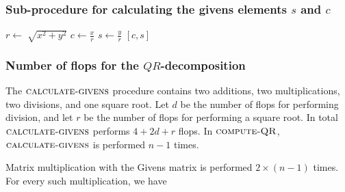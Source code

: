 \subsubsection*{Sub-procedure for calculating the givens elements $s$ and $c$}
\begin{algorithmic}
\State $r \gets \sqrt[]{x^2+y^2 }$ 
\State $c \gets \frac{x}{r} $
\State $s \gets \frac{y}{r} $
\State \Return $[c, s]$
\EndFunction
\end{algorithmic}

\subsubsection*{Number of flops for the $QR$-decomposition}
The $\textsc{calculate-givens}$ procedure contains two additions, two multiplications, two divisions, and one square root. 
Let $d$ be the number of flops for performing division, and let $r$ be the number of flops for performing a square root. 
In total $\textsc{calculate-givens}$ performs $4+2d+r$ flops. In $\textsc{compute-QR}$, $\textsc{calculate-givens}$ is performed $n-1$ times. 

Matrix multiplication with the Givens matrix is performed $2 \times (n-1)$ times. For every such multiplication, we have 




